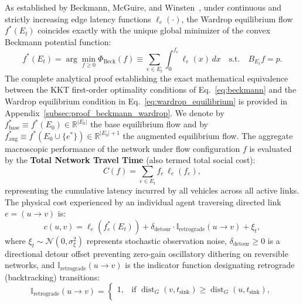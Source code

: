 \documentclass[11pt,a4paper]{article}
\begin{document}
\begin{itemize}
    As established by Beckmann, McGuire, and Winsten~\cite{beckmann1956studies}, under continuous and strictly increasing edge latency functions $\ell_e(\cdot)$, the Wardrop equilibrium flow $f^*(E_t)$ coincides exactly with the unique global minimizer of the convex Beckmann potential function:
    \begin{equation}
    \label{eq:beckmann}
    f^*(E_t) = \arg\min_{f \ge 0} \Phi_{\text{Beck}}(f) \equiv \sum_{e \in E_t} \int_0^{f_e} \ell_e(x) \, dx \quad \text{s.t.} \quad B_{E_t} f = p.
    \end{equation}
    The complete analytical proof establishing the exact mathematical equivalence between the KKT first-order optimality conditions of Eq.~\eqref{eq:beckmann} and the Wardrop equilibrium condition in Eq.~\eqref{eq:wardrop_equilibrium} is provided in Appendix~\ref{subsec:proof_beckmann_wardrop}.
    We denote by $f_{\text{base}}^* \equiv f^*(E_0) \in \mathbb{R}^{|E_0|}$ the base equilibrium flow and by $f_{\text{aug}}^* \equiv f^*(E_0 \cup \{e^*\}) \in \mathbb{R}^{|E_0|+1}$ the augmented equilibrium flow. The aggregate macroscopic performance of the network under flow configuration $f$ is evaluated by the \textbf{Total Network Travel Time} (also termed total social cost):
    \begin{equation}
    \label{eq:total_travel_time}
    C(f) = \sum_{e \in E_t} f_e \, \ell_e(f_e),
    \end{equation}
    representing the cumulative latency incurred by all vehicles across all active links. The physical cost experienced by an individual agent traversing directed link $e = (u \to v)$ is:
    \begin{equation}
    \label{eq:agent_step_cost}
    c(u, v) = \ell_e(f_e^*(E_t)) + \delta_{\text{detour}} \cdot \mathbb{I}_{\text{retrograde}}(u \to v) + \xi_t,
    \end{equation}
    where $\xi_t \sim \mathcal{N}(0, \sigma_{\xi}^2)$ represents stochastic observation noise, $\delta_{\text{detour}} \ge 0$ is a directional detour offset preventing zero-gain oscillatory dithering on reversible networks, and $\mathbb{I}_{\text{retrograde}}(u \to v)$ is the indicator function designating retrograde (backtracking) transitions:
    \begin{equation}
    \label{eq:retrograde_indicator}
    \mathbb{I}_{\text{retrograde}}(u \to v) = 
    \begin{cases}
    1, & \text{if } \operatorname{dist}_G(v, t_{\text{sink}}) \ge \operatorname{dist}_G(u, t_{\text{sink}}), \\

\end{cases}
\end{equation}
\end{itemize}
\end{document}

